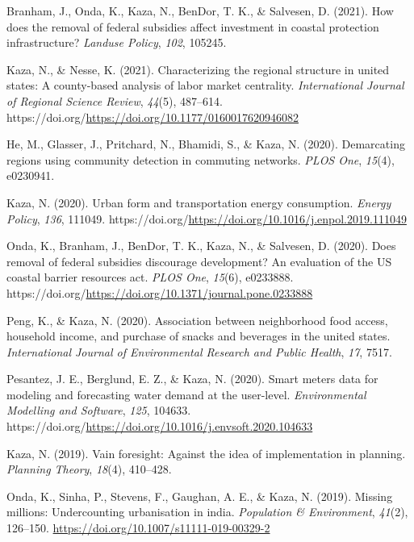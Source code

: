\documentclass[11pt,a4paper,]{awesome-cv}
\newlength{\cslhangindent}
\newenvironment{CSLReferences}[2] %
 {\begin{list}{}{%
  \setlength{\itemindent}{0pt}
  \setlength{\leftmargin}{0pt}
  \setlength{\parsep}{0pt}
  \ifodd #1
   \setlength{\leftmargin}{\cslhangindent}
   \setlength{\itemindent}{-1\cslhangindent}
  \fi
  \setlength{\itemsep}{#2\baselineskip}}}
 {\end{list}}
\begin{document}
\begin{CSLReferences}{1}{0}
Branham, J., Onda, K., Kaza, N., BenDor, T. K., \& Salvesen, D. (2021).
How does the removal of federal subsidies affect investment in coastal
protection infrastructure? \emph{Landuse Policy}, \emph{102}, 105245.

Kaza, N., \& Nesse, K. (2021). Characterizing the regional structure in
united states: A county-based analysis of labor market centrality.
\emph{International Journal of Regional Science Review}, \emph{44}(5),
487--614. https://doi.org/\url{https://doi.org/10.1177/0160017620946082}

He, M., Glasser, J., Pritchard, N., Bhamidi, S., \& Kaza, N. (2020).
Demarcating regions using community detection in commuting networks.
\emph{PLOS One}, \emph{15}(4), e0230941.

Kaza, N. (2020). Urban form and transportation energy consumption.
\emph{Energy Policy}, \emph{136}, 111049.
https://doi.org/\url{https://doi.org/10.1016/j.enpol.2019.111049}

Onda, K., Branham, J., BenDor, T. K., Kaza, N., \& Salvesen, D. (2020).
Does removal of federal subsidies discourage development? An evaluation
of the US coastal barrier resources act. \emph{PLOS One}, \emph{15}(6),
e0233888.
https://doi.org/\url{https://doi.org/10.1371/journal.pone.0233888}

Peng, K., \& Kaza, N. (2020). Association between neighborhood food
access, household income, and purchase of snacks and beverages in the
united states. \emph{International Journal of Environmental Research and
Public Health}, \emph{17}, 7517.

Pesantez, J. E., Berglund, E. Z., \& Kaza, N. (2020). Smart meters data
for modeling and forecasting water demand at the user-level.
\emph{Environmental Modelling and Software}, \emph{125}, 104633.
https://doi.org/\url{https://doi.org/10.1016/j.envsoft.2020.104633}

Kaza, N. (2019). Vain foresight: Against the idea of implementation in
planning. \emph{Planning Theory}, \emph{18}(4), 410--428.

Onda, K., Sinha, P., Stevens, F., Gaughan, A. E., \& Kaza, N. (2019).
Missing millions: Undercounting urbanisation in india. \emph{Population
\& Environment}, \emph{41}(2), 126--150.
\url{https://doi.org/10.1007/s11111-019-00329-2}


\end{CSLReferences}
\end{document}
